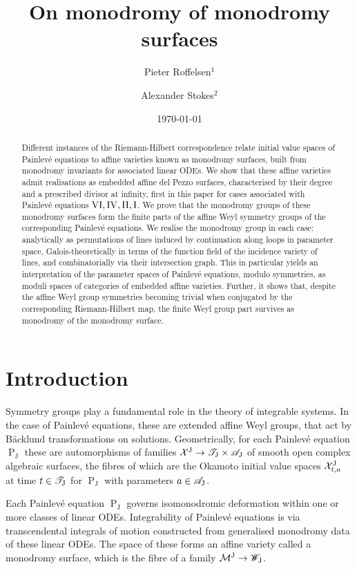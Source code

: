 \documentclass[a4paper,reqno]{amsart}
\title[On monodromy of monodromy surfaces]{On monodromy of monodromy surfaces}
\author{Pieter Roffelsen$^{1}$}
\author{Alexander Stokes$^{2}$}
\date{\today}
\numberwithin{equation}{section}
\newcommand{\pain}[1]{\operatorname{P}_{\mathrm{#1}}}
\numberwithin{equation}{section}
\begin{document}
\begin{abstract}
Different instances of the Riemann-Hilbert correspondence relate initial value spaces of Painlev\'e equations to affine varieties known as monodromy surfaces, built from monodromy invariants for associated linear ODEs.
We show that these affine varieties admit realisations as embedded affine del Pezzo surfaces, characterised by their degree and a prescribed divisor at infinity, first in this paper for cases associated with Painlev\'e equations $\rm{VI},\rm{IV},\rm{II},\rm{I}$.
 We prove that the monodromy groups of these monodromy surfaces form the finite parts of the affine Weyl symmetry groups of the corresponding Painlev\'e equations.
We realise the monodromy group in each case: analytically as permutations of lines induced by continuation along loops in parameter space, Galois-theoretically in terms of the function field of the incidence variety of lines, and combinatorially via their intersection graph. 
This in particular yields an interpretation of the parameter spaces of Painlev\'e equations, modulo symmetries, as moduli spaces of categories of embedded affine varieties.
Further, it shows that, despite the affine Weyl group symmetries becoming trivial when conjugated by the corresponding Riemann-Hilbert map, the finite Weyl group part survives as monodromy of the monodromy surface.
\end{abstract}

\maketitle



\section{Introduction}
Symmetry groups play a fundamental role in the theory of integrable systems. In the case of Painlev\'e equations, these are extended affine Weyl groups, that act by B\"acklund transformations on solutions.
Geometrically, for each Painlev\'e equation $\pain{J}$ these are automorphisms of families $\mathcal{X}^{\rm{J}} \to \mathscr{T}_{\rm{J}}\times \mathscr{A}_{\rm{J}}$ of smooth open complex algebraic surfaces, the fibres of which are the Okamoto initial value spaces $\mathcal{X}_{t,a}^{\rm{J}}$ at time $t\in\mathscr{T}_{\rm{J}}$ for $\pain{J}$ with parameters $a\in\mathscr{A}_{\rm{J}}$.

Each Painlev\'e equation $\pain{J}$ governs isomonodromic deformation within one or more classes of linear ODEs. 
Integrability of Painlev\'e equations is via transcendental integrals of motion constructed from generalised monodromy data of these linear ODEs.
The space of these forms an affine variety called a monodromy surface, which is the fibre of a family $\mathcal{M}^{\rm{J}}\to\mathscr{W}_{\rm{J}}$.
\end{document}
